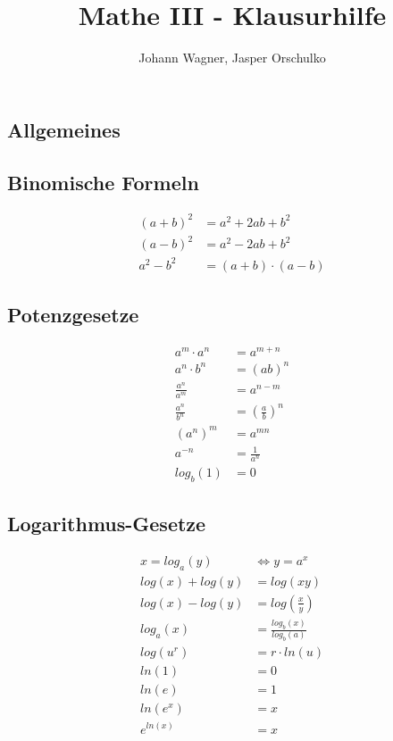 \documentclass[a4paper, 8pt, landscape]{extarticle}
\author{Johann Wagner, Jasper Orschulko}
\title{Mathe III - Klausurhilfe}
\begin{document}
	\setlength{\abovedisplayskip}{0pt}
	\setlength{\belowdisplayskip}{0pt}

    \begin{multicols*}{5}
   	\raggedcolumns
	\section{Allgemeines}
		\subsection{Binomische Formeln}
			\begin{align*}
				(a+b)^{2} &= a^{2}+2ab+b^{2}\\
			    (a-b)^{2} &= a^{2}-2ab+b^{2}\\
			    a^{2}-b^{2} &= (a+b)\cdot(a-b)
			\end{align*}
		\subsection{Potenzgesetze}
			\begin{align*}
	            a^m \cdot a^n &= a^{m+n}\\
	            a^n \cdot b^n &= (ab)^n\\
	            \frac{a^n}{a^m} &= a^{n-m}\\
	            \frac{a^n}{b^n} &= \left(\frac{a}{b}\right)^n\\
	            (a^n)^m &= a^{mn}\\
	            a^{-n} &= \frac{1}{a^n}\\
	            log_b(1) &= 0
            \end{align*}
         \subsection{Logarithmus-Gesetze}
         	\begin{align*}
		         x = log_a(y) &\Leftrightarrow y = a^x\\
		         log(x) + log(y) &= log(xy)\\
		         log(x) - log(y) &= log(\frac{x}{y})\\
		         log_a(x) &= \frac{log_b(x)}{log_b(a)}\\
		         log(u^r) &= r \cdot ln(u)\\
		         ln(1) &= 0\\
		         ln(e) &= 1\\
		         ln(e^x) &= x\\
		         e^{ln(x)} &= x
		    \end{align*}

\end{multicols*}
\end{document}
